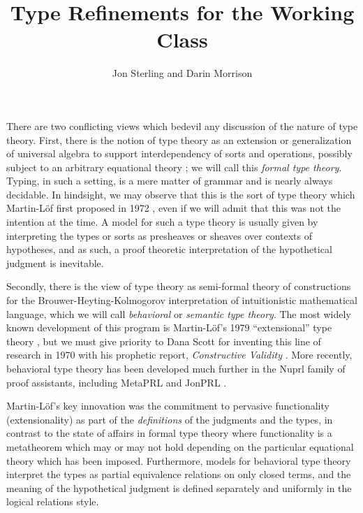 \documentclass[11pt]{article}
\theoremstyle{definition}
\theoremstyle{remark}
\numberwithin{equation}{section}
\begin{document}
\title{Type Refinements for the Working Class}
\date{}
\author{Jon Sterling and Darin Morrison}
\maketitle

There are two conflicting views which bedevil any discussion of the nature of
type theory. First, there is the notion of type theory as an extension or
generalization of universal algebra to support interdependency of sorts and
operations, possibly subject to an arbitrary equational theory
\cite{cartmell:1986, dybjer:1996}; we will call this \emph{formal type theory}.
Typing, in such a setting, is a mere matter of grammar and is nearly always
decidable. In hindsight, we may observe that this is the sort of type theory
which Martin-L\"of first proposed in 1972 \cite{martin-lof:1972}, even if we
will admit that this was not the intention at the time. A model for such a type
theory is usually given by interpreting the types or sorts as presheaves or
sheaves over contexts of hypotheses, and as such, a proof theoretic
interpretation of the hypothetical judgment is inevitable.

Secondly, there is the view of type theory as semi-formal theory of
constructions for the Brouwer-Heyting-Kolmogorov interpretation of
intuitionistic mathematical language, which we will call \emph{behavioral} or
\emph{semantic type theory}. The most widely known development of this program
is Martin-L\"of's 1979 ``extensional'' type theory \cite{martin-lof:1979,
martin-lof:1984}, but we must give priority to Dana Scott for inventing this
line of research in 1970 with his prophetic report, \emph{Constructive
Validity} \cite{scott:1970}. More recently, behavioral type theory has been
developed much further in the Nuprl family \cite{constable:1986} of proof
assistants, including MetaPRL \cite{hickey:2003} and JonPRL \cite{jonprl:2015}.

Martin-L\"of's key innovation was the commitment to pervasive functionality
(extensionality) as part of the \emph{definitions} of the judgments and the
types, in contrast to the state of affairs in formal type theory where
functionality is a metatheorem which may or may not hold depending on the
particular equational theory which has been imposed. Furthermore, models for
behavioral type theory interpret the types as partial equivalence relations on
only closed terms, and the meaning of the hypothetical judgment is defined
separately and uniformly in the logical relations style.
\end{document}
